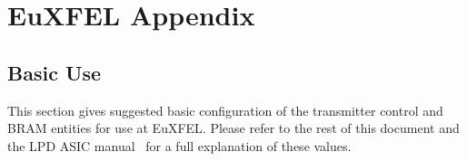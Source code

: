 \appendix
\chapter{EuXFEL Appendix} %
\label{cha:appendix}
\section{Basic Use} %
\label{app:basic_use}
    
This section gives suggested basic configuration of the transmitter control and BRAM entities for use at EuXFEL. Please refer to the rest of this document and the LPD ASIC manual~\cite{LPD ASIC MANUAL ref} for a full explanation of these values.
    
